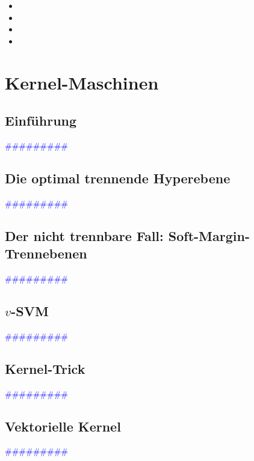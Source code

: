 \documentclass{article}
\begin{document}
      \begin{itemize}
      \color{red}
        \item 
        \item
      \color{ForestGreen}
        \item 
        \item
      \end{itemize}




\newpage
\section{Kernel-Maschinen} %
  \subsection{Einführung} %
      \textcolor{blue}{\#\#\#\#\#\#\#\#\#}
  \subsection{Die optimal trennende Hyperebene} %
      \textcolor{blue}{\#\#\#\#\#\#\#\#\#}
  \subsection{Der nicht trennbare Fall: Soft-Margin-Trennebenen} %
      \textcolor{blue}{\#\#\#\#\#\#\#\#\#}
  \subsection{$v$-SVM} %
      \textcolor{blue}{\#\#\#\#\#\#\#\#\#}
  \subsection{Kernel-Trick} %
      \textcolor{blue}{\#\#\#\#\#\#\#\#\#}
  \subsection{Vektorielle Kernel} %
      \textcolor{blue}{\#\#\#\#\#\#\#\#\#}
\end{document}
